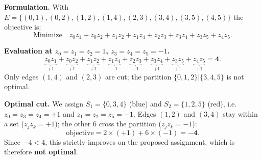 \documentclass{ceri/sty/rapport}
\begin{document}
\begin{solution}
\textbf{Formulation.}
With $E = \{(0,1),(0,2),(1,2),(1,4),(2,3),(3,4),(3,5),(4,5)\}$ the objective is:
\[
  \text{Minimize} \quad
  z_0 z_1 + z_0 z_2 + z_1 z_2 + z_1 z_4 + z_2 z_3 + z_3 z_4 + z_3 z_5 + z_4 z_5.
\]

\textbf{Evaluation at $z_0=z_1=z_2=1$, $z_3=z_4=z_5=-1$.}
\[
  \underbrace{z_0 z_1}_{+1} + \underbrace{z_0 z_2}_{+1} + \underbrace{z_1 z_2}_{+1}
  + \underbrace{z_1 z_4}_{-1} + \underbrace{z_2 z_3}_{-1} + \underbrace{z_3 z_4}_{+1}
  + \underbrace{z_3 z_5}_{+1} + \underbrace{z_4 z_5}_{+1} = \mathbf{4}.
\]
Only edges $(1,4)$ and $(2,3)$ are cut; the partition $\{0,1,2\}|\{3,4,5\}$ is not optimal.

\textbf{Optimal cut.}
We assign $S_1 = \{0, 3, 4\}$ (blue) and $S_2 = \{1, 2, 5\}$ (red),
i.e.\ $z_0=z_3=z_4=+1$ and $z_1=z_2=z_5=-1$.
Edges $(1,2)$ and $(3,4)$ stay within a set ($z_j z_k = +1$);
the other 6 cross the partition ($z_j z_k = -1$):
\[
  \text{objective} = 2\times(+1) + 6\times(-1) = \mathbf{-4}.
\]
Since $-4 < 4$, this strictly improves on the proposed assignment,
which is therefore \textbf{not optimal}.

\medskip
\begin{center}
\end{center}
\end{solution}
\end{document}
